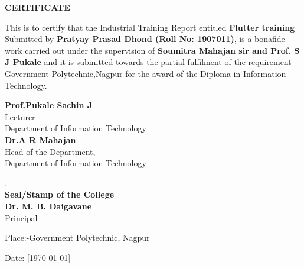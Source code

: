 
\begin{center}
{\Large{\bf{CERTIFICATE}}}
\end{center}

\noindent

This is to certify that the Industrial Training Report entitled \textbf{Flutter training} Submitted by \textbf{Pratyay Prasad Dhond (Roll No: 1907011)}, is a bonafide work carried out under the supervision of \textbf{Soumitra Mahajan sir and Prof. S J Pukale} and it is submitted towards the partial fulfilment of the requirement Government Polytechnic,Nagpur for the award of the Diploma in Information Technology.
\vskip 0.6in
\begin{center}
\begin{multicols}{2}
{ \bf Prof.Pukale Sachin J}\\Lecturer\\Department of Information Technology\\ 
{\bf Dr.A R Mahajan}\\Head of the Department,\\Department of Information Technology\\

\end{multicols}
\end{center}
\vskip 0.4in
\begin{center}
\begin{multicols}{2}

.\\{\bf Seal/Stamp of the College}\\
{\bf \large Dr. M. B. Daigavane}\\{Principal}

\end{multicols}
\end{center}
\vspace{2cm}

\noindent Place:-Government Polytechnic, Nagpur \hfill 

\noindent Date:-[\today]

\clearpage

